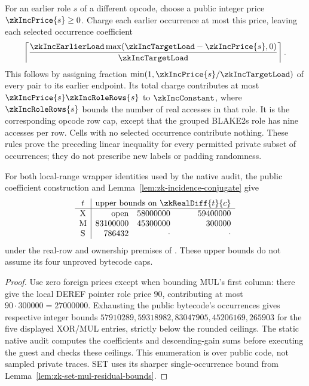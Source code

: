 For an earlier role $s$ of a different opcode, choose a public integer price $\zkIncPrice{s}\ge0$. Charge each earlier occurrence at most this price, leaving each selected occurrence coefficient
\[
 \left\lceil\frac{\zkIncEarlierLoad\max(\zkIncTargetLoad-\zkIncPrice{s},0)}{\zkIncTargetLoad}\right\rceil.
\]
This follows by assigning fraction $\min(1,\zkIncPrice{s}/\zkIncTargetLoad)$ of every pair to its earlier endpoint. Its total charge contributes at most $\zkIncPrice{s}\zkIncRoleRows{s}$ to $\zkIncConstant$, where $\zkIncRoleRows{s}$ bounds the number of real accesses in that role. It is the corresponding opcode row cap, except that the grouped BLAKE2s role has nine accesses per row. Cells with no selected occurrence contribute nothing. These rules prove the preceding linear inequality for every permitted private subset of occurrences; they do not prescribe new labels or padding randomness.

\begin{proposition}\label{prop:zk-public-incidence-differences}
For both local-range wrapper identities used by the native audit, the public coefficient construction and Lemma~\ref{lem:zk-incidence-conjugate} give
\[
\begin{array}{c|rrr}
 t&\multicolumn{3}{c}{\text{upper bounds on }\zkRealDiff{t}{c}}\\\hline
 \mathrm X&\text{open}&58000000&59400000\\
 \mathrm M&83100000&45300000&300000\\
 \mathrm S&786432&\cdot&\cdot
\end{array}
\]
under the real-row and ownership premises of . These upper bounds do not assume its four unproved bytecode caps.
\end{proposition}
\begin{proof}
Use zero foreign prices except when bounding MUL's first column: there give the local DEREF pointer role price $90$, contributing at most $90\cdot300000=27000000$. Exhausting the public bytecode's occurrences gives respective integer bounds $57910289,59318982,83047905,45206169,265903$ for the five displayed XOR/MUL entries, strictly below the rounded ceilings. The static native audit computes the coefficients and descending-gain sums before executing the guest and checks these ceilings. This enumeration is over public code, not sampled private traces. SET uses its sharper single-occurrence bound from Lemma~\ref{lem:zk-set-mul-residual-bounds}.
\end{proof}

